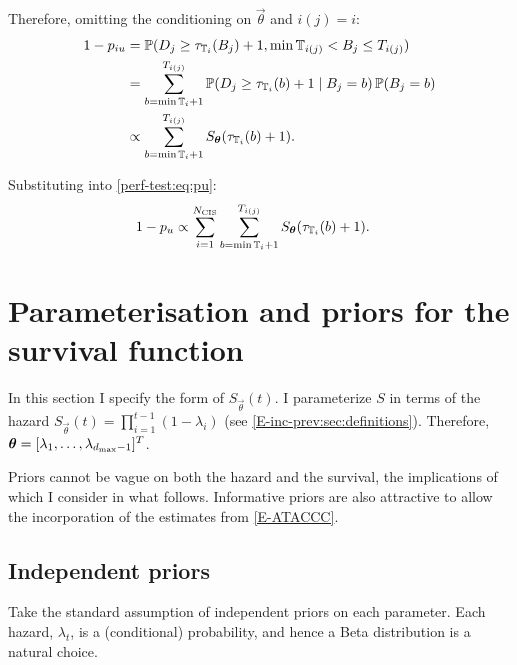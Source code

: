\documentclass[thesis.tex]{subfiles}
\begin{document}
Therefore, omitting the conditioning on $\vec{\theta}$ and $i(j) = i$:
\begin{align}
1 - p_{iu}
&= \operatorname{\mathbb{P}}(D_j \geq \tau_{\mathbb{T}_{i}}(B_j)+ 1, \min \mathbb{T}_{i(j)} < B_j \leq T_{i(j)}) \\
&= \sum_{b = \min \mathbb{T}_{i} + 1}^{T_{i(j)}} \operatorname{\mathbb{P}}(D_j \geq \tau_{\mathbb{T}_{i}}(b) + 1 \mid B_j = b) \operatorname{\mathbb{P}}(B_j = b)\\
&\propto \sum_{b = \min \mathbb{T}_{i} + 1}^{T_{i(j)}} S_{\bm{\theta}}(\tau_{\mathbb{T}_{i}}(b) + 1).
\label{perf-test:eq:piu}
\end{align}

Substituting into \cref{perf-test:eq:pu}:
\begin{align}
1 - p_u
& \propto \sum_{i=1}^{N_\text{CIS}} \sum_{b = \min \mathbb{T}_{i} + 1}^{T_{i(j)}} S_{\bm{\theta}}(\tau_{\mathbb{T}_{i}}(b) + 1).
\end{align}

\section{Parameterisation and priors for the survival function} \label{perf-test:sec:parameters-priors}

In this section I specify the form of $S_{\vec{\theta}}(t)$.
I parameterize $S$ in terms of the hazard $S_{\vec{\theta}}(t) = \prod_{i=1}^{t-1} (1 - \lambda_{i})$ (see \cref{E-inc-prev:sec:definitions}).
Therefore, $\bm{\theta} = [\lambda_1, \dots, \lambda_{d_\text{max}-1}]^T$.

Priors cannot be vague on both the hazard and the survival, the implications of which I consider in what follows.
Informative priors are also attractive to allow the incorporation of the estimates from \cref{E-ATACCC}.

\subsection{Independent priors} \label{perf-test:sec:independent-priors}
Take the standard assumption of independent priors on each parameter.
Each hazard, $\lambda_t$, is a (conditional) probability, and hence a Beta distribution is a natural choice.
\end{document}
